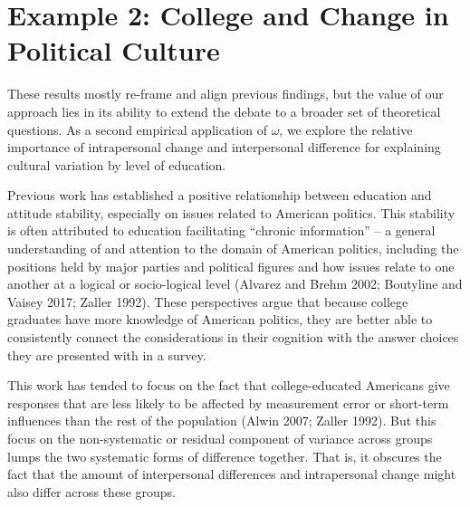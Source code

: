 \documentclass[
  12pt,
]{article}
\begin{document}
\hypertarget{example-2-college-and-change-in-political-culture}{%
\section{Example 2: College and Change in Political
Culture}\label{example-2-college-and-change-in-political-culture}}

These results mostly re-frame and align previous findings, but the value
of our approach lies in its ability to extend the debate to a broader
set of theoretical questions. As a second empirical application of
\(\omega\), we explore the relative importance of intrapersonal change
and interpersonal difference for explaining cultural variation by level
of education.

Previous work has established a positive relationship between education
and attitude stability, especially on issues related to American
politics. This stability is often attributed to education facilitating
``chronic information'' -- a general understanding of and attention to
the domain of American politics, including the positions held by major
parties and political figures and how issues relate to one another at a
logical or socio-logical level (Alvarez and Brehm 2002; Boutyline and
Vaisey 2017; Zaller 1992). These perspectives argue that because college
graduates have more knowledge of American politics, they are better able
to consistently connect the considerations in their cognition with the
answer choices they are presented with in a survey.

This work has tended to focus on the fact that college-educated
Americans give responses that are less likely to be affected by
measurement error or short-term influences than the rest of the
population (Alwin 2007; Zaller 1992). But this focus on the
non-systematic or residual component of variance across groups lumps the
two systematic forms of difference together. That is, it obscures the
fact that the amount of interpersonal differences and intrapersonal
change might also differ across these groups.
\end{document}
